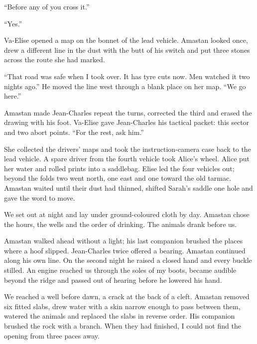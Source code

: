 ``Before any of you cross it.''\par

``Yes.''\par

Va-Elise opened a map on the bonnet of the lead vehicle. Amastan looked once, drew a different line in the dust with the butt of his switch and put three stones across the route she had marked.\par

``That road was safe when I took over. It has tyre cuts now. Men watched it two nights ago.'' He moved the line west through a blank place on her map. ``We go here.''\par

Amastan made Jean-Charles repeat the turns, corrected the third and erased the drawing with his foot. Va-Elise gave Jean-Charles his tactical packet: this sector and two abort points. ``For the rest, ask him.''\par

She collected the drivers' maps and took the instruction-camera case back to the lead vehicle. A spare driver from the fourth vehicle took Alice's wheel. Alice put her water and rolled prints into a saddlebag. Elise led the four vehicles out; beyond the folds two went north, one east and one toward the old tarmac. Amastan waited until their dust had thinned, shifted Sarah's saddle one hole and gave the word to move.\par

We set out at night and lay under ground-coloured cloth by day. Amastan chose the hours, the wells and the order of drinking. The animals drank before us.\par

Amastan walked ahead without a light; his last companion brushed the places where a hoof slipped. Jean-Charles twice offered a bearing. Amastan continued along his own line. On the second night he raised a closed hand and every buckle stilled. An engine reached us through the soles of my boots, became audible beyond the ridge and passed out of hearing before he lowered his hand.\par

We reached a well before dawn, a crack at the back of a cleft. Amastan removed six fitted slabs, drew water with a skin narrow enough to pass between them, watered the animals and replaced the slabs in reverse order. His companion brushed the rock with a branch. When they had finished, I could not find the opening from three paces away.\par

